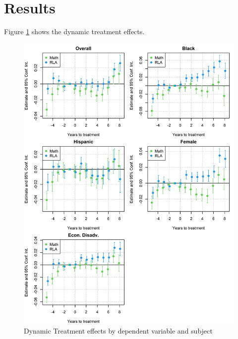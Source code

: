 \section{Results} \label{Results}

Figure \ref{ResultsPlot} shows the dynamic treatment effects.

%

%

\begin{figure}[!h]
	\centering
	\includegraphics[scale=1]{"../Code & Data/ResultsPlot.png"}
	\caption{Dynamic Treatment effects by dependent variable and subject}
	\label{ResultsPlot}
\end{figure}




